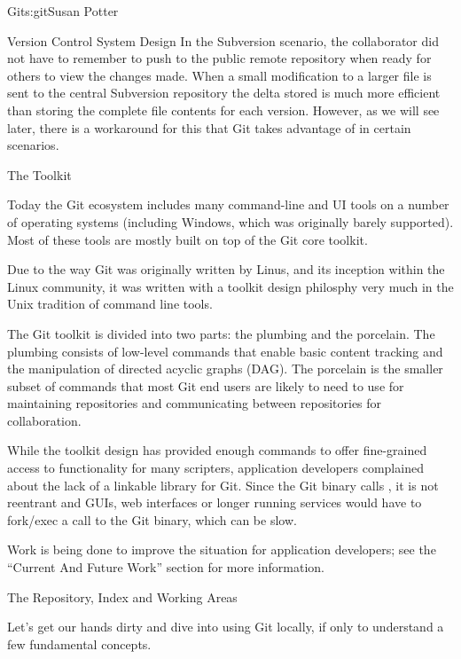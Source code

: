 \begin{aosachapter}{Git}{s:git}{Susan Potter}
\begin{aosasect1}{Version Control System Design}
In the Subversion scenario, the collaborator did not have to remember
to push to the public remote repository when ready for others to
view the changes made. When a small modification to a larger file is sent
to the central Subversion repository the delta stored is much more
efficient than storing the complete file contents for each version.
However, as we will see later, there is a workaround for this that Git
takes advantage of in certain scenarios.

\end{aosasect1}

\begin{aosasect1}{The Toolkit}

Today the Git ecosystem includes many command-line and UI tools on a number
of operating systems (including Windows, which was originally barely
supported). Most of these tools are mostly built on top of the Git core
toolkit.

Due to the way Git was originally written by Linus, and its inception within
the Linux community, it was written with a toolkit design philosphy very much
in the Unix tradition of command line tools.

The Git toolkit is divided into two parts: the plumbing and
the porcelain. The plumbing consists of low-level commands that enable
basic content tracking and
the manipulation of directed acyclic graphs (DAG). The porcelain is 
the smaller subset of  commands that most
Git end users are likely to need to use for maintaining repositories and
communicating between repositories for collaboration.

While the toolkit design has provided enough commands to offer fine-grained
access to functionality for many scripters, application developers
complained about the lack of a linkable library for Git. Since the Git binary
calls , it is not reentrant and GUIs, web interfaces or longer
running services would have to fork/exec a call to the Git binary, which can
be slow.

Work is being done to improve the situation for application developers; see
the ``Current And Future Work'' section for more information.
\end{aosasect1}

\begin{aosasect1}{The Repository, Index and Working Areas}

Let's get our hands dirty and dive into using Git locally, if only to
understand a few fundamental concepts.


\end{aosasect1}
\end{aosachapter}
